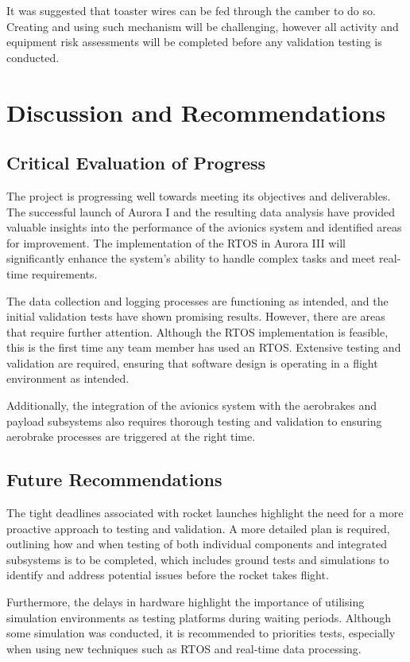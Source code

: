 It was suggested that toaster wires can be fed through the camber to do so. Creating and using such mechanism will be challenging, however all activity and equipment risk assessments will be completed before any validation testing is conducted.  

\section{Discussion and Recommendations}

\subsection{Critical Evaluation of Progress}
The project is progressing well towards meeting its objectives and deliverables. The successful launch of Aurora I and the resulting data analysis have provided valuable insights into the performance of the avionics system and identified areas for improvement. The implementation of the RTOS in Aurora III will significantly enhance the system's ability to handle complex tasks and meet real-time requirements. 

The data collection and logging processes are functioning as intended, and the initial validation tests have shown promising results. However, there are areas that require further attention. Although the RTOS implementation is feasible, this is the first time any team member has used an RTOS. Extensive testing and validation are required, ensuring that software design is operating in a flight environment as intended. 

Additionally, the integration of the avionics system with the aerobrakes and payload subsystems also requires thorough testing and validation to ensuring aerobrake processes are triggered at the right time.  

\subsection{Future Recommendations}
The tight deadlines associated with rocket launches highlight the need for a more proactive approach to testing and validation. A more detailed plan is required, outlining how and when testing of both individual components and integrated subsystems is to be completed, which includes ground tests and simulations to identify and address potential issues before the rocket takes flight. 

Furthermore, the delays in hardware highlight the importance of utilising simulation environments as testing platforms during waiting periods. Although some simulation was conducted, it is recommended to priorities tests, especially when using new techniques such as RTOS and real-time data processing.  

